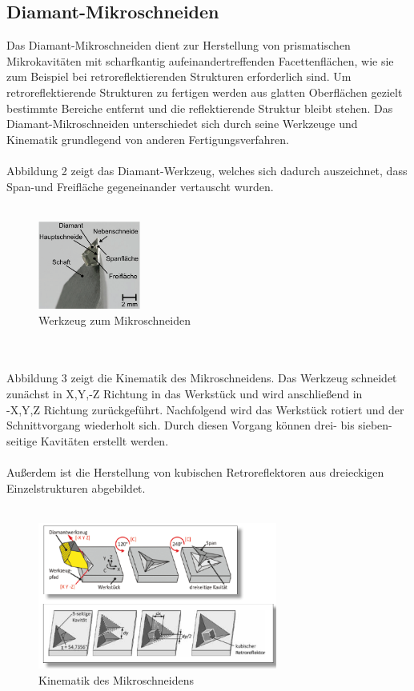 \documentclass[12pt,a4paper,bibliography=totocnumbered,listof=totocnumbered]{scrartcl}
\begin{document}
\subsection{Diamant-Mikroschneiden}
Das Diamant-Mikroschneiden dient zur Herstellung von prismatischen Mikrokavitäten mit scharfkantig aufeinandertreffenden Facettenflächen, wie sie zum Beispiel bei retroreflektierenden Strukturen erforderlich sind. Um retroreflektierende Strukturen zu fertigen werden aus glatten Oberflächen gezielt bestimmte Bereiche entfernt und die reflektierende Struktur bleibt stehen. Das Diamant-Mikroschneiden unterschiedet sich durch seine Werkzeuge und Kinematik grundlegend von anderen Fertigungsverfahren. \\ \\
Abbildung 2 zeigt das Diamant-Werkzeug, welches sich dadurch auszeichnet, dass Span-und Freifläche gegeneinander vertauscht wurden. \\ \\
\begin{figure}[htbp]
\centering 
\includegraphics[width=0.3\textwidth]{Werkzeug.PNG}
\caption [Gla09]{Werkzeug zum Mikroschneiden}
\label{fig:Bild2}
\end{figure}
\pagebreak
\\ \\
Abbildung 3 zeigt die Kinematik des Mikroschneidens. Das Werkzeug schneidet zunächst in X,Y,-Z Richtung in das Werkstück und wird anschließend in \\-X,Y,Z Richtung zurückgeführt. Nachfolgend wird das Werkstück rotiert und der Schnittvorgang wiederholt sich. Durch diesen Vorgang können drei- bis sieben-seitige Kavitäten erstellt werden. \\ \\
Außerdem ist die Herstellung von kubischen Retroreflektoren aus dreieckigen Einzelstrukturen abgebildet. \\ \\
\begin{figure}[htbp]
\centering 
\includegraphics[width=0.7\textwidth]{Mikroschneiden_Kinematik.PNG}
\caption[Sch14]{Kinematik des Mikroschneidens}
\label{fig:Bild3}
\end{figure}
\end{document}
